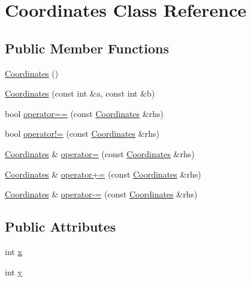\hypertarget{class_coordinates}{}\section{Coordinates Class Reference}
\label{class_coordinates}
\subsection*{Public Member Functions}
\begin{DoxyCompactItemize}
\item 
\mbox{\hyperlink{class_coordinates_a89dd10af87d803fd51dfd9987f32e8cd}{Coordinates}} ()
\item 
\mbox{\hyperlink{class_coordinates_a77ac76bd12242e5367c0770688abe263}{Coordinates}} (const int \&a, const int \&b)
\item 
bool \mbox{\hyperlink{class_coordinates_ac534d35d1892e05d2bfe12f8595fec18}{operator==}} (const \mbox{\hyperlink{class_coordinates}{Coordinates}} \&rhs)
\item 
bool \mbox{\hyperlink{class_coordinates_a9dfe3f27ff9eb21ddfafdae7b6713071}{operator!=}} (const \mbox{\hyperlink{class_coordinates}{Coordinates}} \&rhs)
\item 
\mbox{\hyperlink{class_coordinates}{Coordinates}} \& \mbox{\hyperlink{class_coordinates_a69f77696d70f40693fb6a15c7b7833de}{operator=}} (const \mbox{\hyperlink{class_coordinates}{Coordinates}} \&rhs)
\item 
\mbox{\hyperlink{class_coordinates}{Coordinates}} \& \mbox{\hyperlink{class_coordinates_a1cb590ea0170e486005033d0ed2db558}{operator+=}} (const \mbox{\hyperlink{class_coordinates}{Coordinates}} \&rhs)
\item 
\mbox{\hyperlink{class_coordinates}{Coordinates}} \& \mbox{\hyperlink{class_coordinates_adbe709d2ce6d40b82de97a7dfebdd025}{operator-\/=}} (const \mbox{\hyperlink{class_coordinates}{Coordinates}} \&rhs)
\end{DoxyCompactItemize}
\subsection*{Public Attributes}
\begin{DoxyCompactItemize}
\item 
int \mbox{\hyperlink{class_coordinates_a11c878fbd2d0805c91af17d2ba2289a1}{x}}
\item 
int \mbox{\hyperlink{class_coordinates_aae83211da8e94ae2edd3b407c19bff07}{y}}
\end{DoxyCompactItemize}


